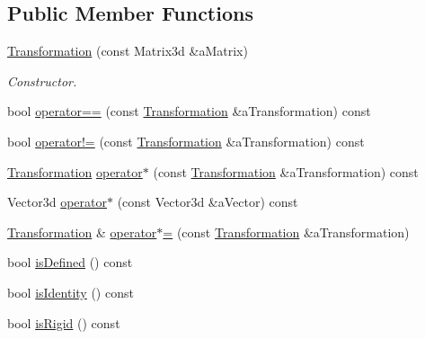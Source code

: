 \subsection*{Public Member Functions}
\begin{DoxyCompactItemize}
\item 
\hyperlink{classlibrary_1_1math_1_1geom_1_1d2_1_1_transformation_a6f284b8a89b0a6db0d5bd4fb13bf2d38}{Transformation} (const Matrix3d \&a\+Matrix)
\begin{DoxyCompactList}\small\item\em Constructor. \end{DoxyCompactList}\item 
bool \hyperlink{classlibrary_1_1math_1_1geom_1_1d2_1_1_transformation_a57ebdbb1a7932034cb476bd0121a0684}{operator==} (const \hyperlink{classlibrary_1_1math_1_1geom_1_1d2_1_1_transformation}{Transformation} \&a\+Transformation) const
\item 
bool \hyperlink{classlibrary_1_1math_1_1geom_1_1d2_1_1_transformation_a0bed1d102c4ae75658866188efad2adb}{operator!=} (const \hyperlink{classlibrary_1_1math_1_1geom_1_1d2_1_1_transformation}{Transformation} \&a\+Transformation) const
\item 
\hyperlink{classlibrary_1_1math_1_1geom_1_1d2_1_1_transformation}{Transformation} \hyperlink{classlibrary_1_1math_1_1geom_1_1d2_1_1_transformation_a99ef3b4a579cbd907570369d2245990e}{operator$\ast$} (const \hyperlink{classlibrary_1_1math_1_1geom_1_1d2_1_1_transformation}{Transformation} \&a\+Transformation) const
\item 
Vector3d \hyperlink{classlibrary_1_1math_1_1geom_1_1d2_1_1_transformation_ab005b2e28c9b568a3bd2e758f6fb5fef}{operator$\ast$} (const Vector3d \&a\+Vector) const
\item 
\hyperlink{classlibrary_1_1math_1_1geom_1_1d2_1_1_transformation}{Transformation} \& \hyperlink{classlibrary_1_1math_1_1geom_1_1d2_1_1_transformation_a62ca803480460ca6e743efd8db0ab3e6}{operator$\ast$=} (const \hyperlink{classlibrary_1_1math_1_1geom_1_1d2_1_1_transformation}{Transformation} \&a\+Transformation)
\item 
bool \hyperlink{classlibrary_1_1math_1_1geom_1_1d2_1_1_transformation_add16e2f819cc7ea5bbee198ba18a8d14}{is\+Defined} () const
\item 
bool \hyperlink{classlibrary_1_1math_1_1geom_1_1d2_1_1_transformation_a9bc03558ea96a68987591aeae20d8468}{is\+Identity} () const
\item 
bool \hyperlink{classlibrary_1_1math_1_1geom_1_1d2_1_1_transformation_af30ebcdee91e0bc20d6b87557cd80111}{is\+Rigid} () const

\end{DoxyCompactItemize}
